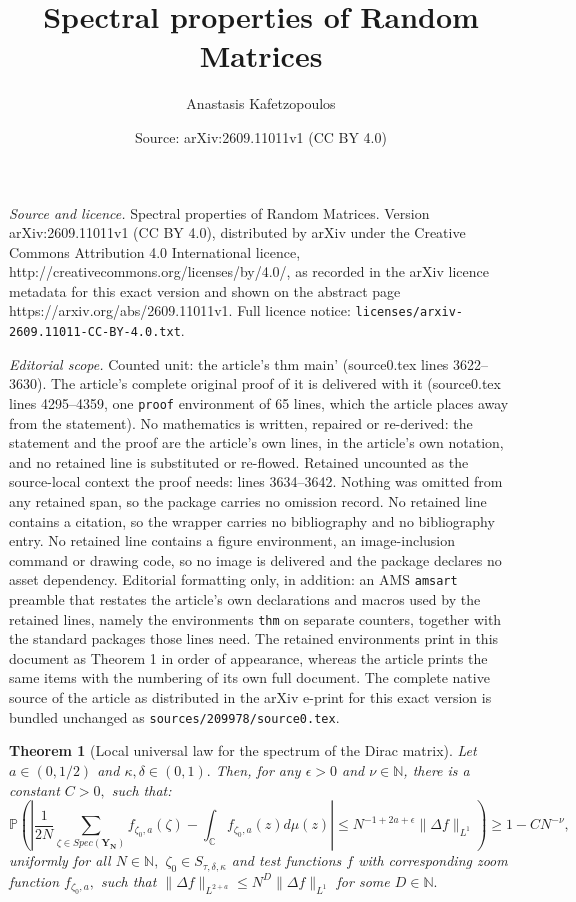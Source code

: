 \documentclass[10pt,a4paper]{amsart}
\title{Spectral properties of Random Matrices}
\author{Anastasis Kafetzopoulos}
\date{Source: arXiv:2609.11011v1 (CC BY 4.0)}
\newtheorem{thm}{Theorem}
\begin{document}
\maketitle

\noindent\emph{Source and licence.} Spectral properties of Random Matrices. Version arXiv:2609.11011v1 (CC BY 4.0), distributed by arXiv under the Creative Commons Attribution 4.0 International licence, http://creativecommons.org/licenses/by/4.0/, as recorded in the arXiv licence metadata for this exact version and shown on the abstract page https://arxiv.org/abs/2609.11011v1. Full licence notice: \texttt{licenses/arxiv-2609.11011-CC-BY-4.0.txt}.\par\smallskip

\noindent\textit{Editorial scope.} Counted unit: the article's thm main' (source0.tex lines 3622--3630). The article's complete original proof of it is delivered with it (source0.tex lines 4295--4359, one \texttt{proof} environment of 65 lines, which the article places away from the statement). No mathematics is written, repaired or re-derived: the statement and the proof are the article's own lines, in the article's own notation, and no retained line is substituted or re-flowed.  Retained uncounted as the source-local context the proof needs: lines 3634--3642.  Nothing was omitted from any retained span, so the package carries no omission record.  No retained line contains a citation, so the wrapper carries no bibliography and no bibliography entry.  No retained line contains a figure environment, an image-inclusion command or drawing code, so no image is delivered and the package declares no asset dependency.  Editorial formatting only, in addition: an AMS \texttt{amsart} preamble that restates the article's own declarations and macros used by the retained lines, namely the environments \texttt{thm} on separate counters, together with the standard packages those lines need.  The retained environments print in this document as Theorem 1 in order of appearance, whereas the article prints the same items with the numbering of its own full document.  The complete native source of the article as distributed in the arXiv e-print for this exact version is bundled unchanged as \texttt{sources/209978/source0.tex}.
\begin{thm}[Local universal law for the spectrum of the Dirac matrix] \label{main}
%
Let $a\in (0,1/2)$ and $\kappa,\delta \in (0,1).$ Then, for any $\epsilon>0$ and $\nu \in \mathbb{N}$, there is a constant $C>0,$ such that:
%
\[
\mathbb{P} \left ( \left | \frac{1}{2N}\sum \limits_{\zeta \in Spec(\mathbf{Y_N})} f_{\zeta_0,a} (\zeta) - \int_{\mathbb{C}} f_{\zeta_0,a} (z) d{\mu}(z)  \right | \leq N^{-1+2a+\epsilon} \|\Delta f\|_{L^1} \right ) \geq 1 - CN^{-\nu},
\]
uniformly for all $N \in \mathbb{N},$ $\zeta_0 \in {S}_{\tau,\delta, \kappa}$ and test functions $f$ with corresponding zoom function $f_{\zeta_0,a},$ such that $\|\Delta f\|_{L^{2+a}} \leq N^D \| \Delta f \|_{L^1}$ for some $D\in \mathbb{N}.$
\end{thm}
\end{document}
